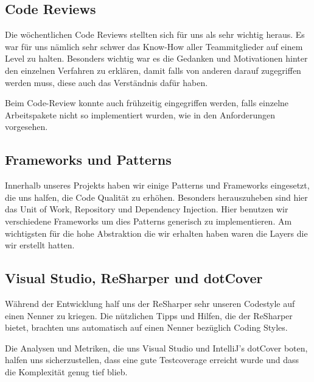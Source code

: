     \subsection{Code Reviews}
Die wöchentlichen Code Reviews stellten sich für uns als sehr wichtig heraus. Es war für uns nämlich sehr schwer das Know-How aller Teammitglieder auf einem Level zu halten. Besonders wichtig war es die Gedanken und Motivationen hinter den einzelnen Verfahren zu erklären, damit falls von anderen darauf zugegriffen werden muss, diese auch das Verständnis dafür haben.

Beim Code-Review konnte auch frühzeitig eingegriffen werden, falls einzelne Arbeitspakete nicht so implementiert wurden, wie in den Anforderungen vorgesehen.
    
    \subsection{Frameworks und Patterns}
Innerhalb unseres Projekts haben wir einige Patterns und Frameworks eingesetzt, die uns halfen, die Code Qualität zu erhöhen. Besonders herauszuheben sind hier das Unit of Work, Repository und Dependency Injection. Hier benutzen wir verschiedene Frameworks um dies Patterns generisch zu implementieren. Am wichtigsten für die hohe Abstraktion die wir erhalten haben waren die Layers die wir erstellt hatten.
    
    \subsection{Visual Studio, ReSharper und dotCover}
    Während der Entwicklung half uns der ReSharper sehr unseren Codestyle auf einen Nenner zu kriegen. Die nützlichen Tipps und Hilfen, die der ReSharper bietet, brachten uns automatisch auf einen Nenner bezüglich Coding Styles.
    
    Die Analysen und Metriken, die uns Visual Studio und IntelliJ’s dotCover boten, halfen uns sicherzustellen, dass eine gute Testcoverage erreicht wurde und dass die Komplexität genug tief blieb.
    
